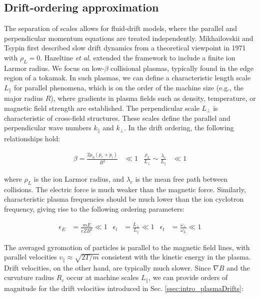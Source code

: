 \subsection{Drift-ordering approximation}
\label{ssec:edge_driftOrdering}
The separation of scales allows for fluid-drift models, where the parallel and perpendicular momentum equations are treated independently. Mikhailovskii and Tsypin\cite{mikhailovskii1971transport} first described slow drift dynamics from a theoretical viewpoint in 1971 with $\rho_L = 0$. Hazeltine \emph{et al.}\cite{hazeltine1985four} extended the framework to include a finite ion Larmor radius. We focus on low-$\beta$ collisional plasmas, typically found in the edge region of a tokamak. In such plasmas, we can define a characteristic length scale $L_\parallel$ for parallel phenomena, which is on the order of the machine size (e.g., the major radius $R$), where gradients in plasma fields such as density, temperature, or magnetic field strength are established. The perpendicular scale $L_\perp$ is characteristic of cross-field structures. These scales define the parallel and perpendicular wave numbers $k_\parallel$ and $k_\perp$. In the drift ordering, the following relationships hold\cite{simakov_2003}:

\begin{align}
	\beta = \frac{2\mu_0(p_e + p_i)}{B^2} &\ll 1 & \frac{\rho_L}{L_\perp} \sim \frac{\lambda_c}{L_\parallel} &\ll 1
\end{align}

where $\rho_L$ is the ion Larmor radius, and $\lambda_c$ is the mean free path between collisions. The electric force is much weaker than the magnetic force. Similarly, characteristic plasma frequencies should be much lower than the ion cyclotron frequency, giving rise to the following ordering parameters:

\begin{align}
	\epsilon_E &= \frac{mE}{eZB^2} \ll 1 & \epsilon_l &= \frac{L_\perp}{L_\parallel} \ll 1 & \epsilon_t &= \frac{\omega_\perp}{\omega_L} \ll 1
\end{align}

The averaged gyromotion of particles is parallel to the magnetic field lines, with parallel velocities $v_\parallel \approx \sqrt{2T/m}$ consistent with the kinetic energy in the plasma. Drift velocities, on the other hand, are typically much slower. Since $\nabla B$ and the curvature radius $R_c$ occur at machine scales $L_\parallel$, we can provide orders of magnitude for the drift velocities introduced in Sec. \ref{ssec:intro_plasmaDrifts}:

